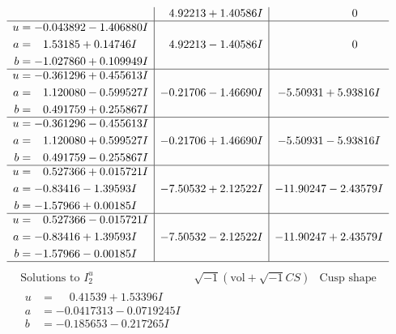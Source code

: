 \documentclass[1p]{elsarticle_modified}
\theoremstyle{definition}
\newcommand{\I}{\sqrt{-1}}
\begin{document}
$$\begin{array}{c|c|c}
 & \phantom{-}4.92213 + 1.40586 I & \phantom{-0.000000 } 0 \\ \hline\begin{aligned}
u &= -0.043892 - 1.406880 I \\
a &= \phantom{-}1.53185 + 0.14746 I \\
b &= -1.027860 + 0.109949 I\end{aligned}
 & \phantom{-}4.92213 - 1.40586 I & \phantom{-0.000000 } 0 \\ \hline\begin{aligned}
u &= -0.361296 + 0.455613 I \\
a &= \phantom{-}1.120080 - 0.599527 I \\
b &= \phantom{-}0.491759 + 0.255867 I\end{aligned}
 & -0.21706 - 1.46690 I & -5.50931 + 5.93816 I \\ \hline\begin{aligned}
u &= -0.361296 - 0.455613 I \\
a &= \phantom{-}1.120080 + 0.599527 I \\
b &= \phantom{-}0.491759 - 0.255867 I\end{aligned}
 & -0.21706 + 1.46690 I & -5.50931 - 5.93816 I \\ \hline\begin{aligned}
u &= \phantom{-}0.527366 + 0.015721 I \\
a &= -0.83416 - 1.39593 I \\
b &= -1.57966 + 0.00185 I\end{aligned}
 & -7.50532 + 2.12522 I & -11.90247 - 2.43579 I \\ \hline\begin{aligned}
u &= \phantom{-}0.527366 - 0.015721 I \\
a &= -0.83416 + 1.39593 I \\
b &= -1.57966 - 0.00185 I\end{aligned}
 & -7.50532 - 2.12522 I & -11.90247 + 2.43579 I\\
 \hline 
 \end{array}$$\newpage$$\begin{array}{c|c|c}  
\text{Solutions to }I^u_{2}& \I (\text{vol} + \sqrt{-1}CS) & \text{Cusp shape}\\
 \hline 
\begin{aligned}
u &= \phantom{-}0.41539 + 1.53396 I \\
a &= -0.0417313 - 0.0719245 I \\
b &= -0.185653 - 0.217265 I\end{aligned}

\end{array}$$
\end{document}
